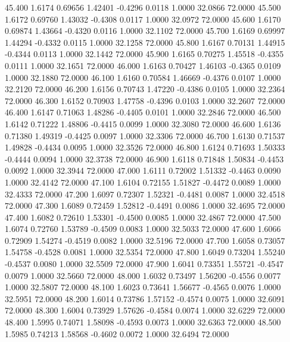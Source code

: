   45.400   1.6174   0.69656   1.42401  -0.4296   0.0118   1.0000  32.0866  72.0000
  45.500   1.6172   0.69760   1.43032  -0.4308   0.0117   1.0000  32.0972  72.0000
  45.600   1.6170   0.69874   1.43664  -0.4320   0.0116   1.0000  32.1102  72.0000
  45.700   1.6169   0.69997   1.44294  -0.4332   0.0115   1.0000  32.1258  72.0000
  45.800   1.6167   0.70131   1.44915  -0.4344   0.0113   1.0000  32.1442  72.0000
  45.900   1.6165   0.70275   1.45518  -0.4355   0.0111   1.0000  32.1651  72.0000
  46.000   1.6163   0.70427   1.46103  -0.4365   0.0109   1.0000  32.1880  72.0000
  46.100   1.6160   0.70584   1.46669  -0.4376   0.0107   1.0000  32.2120  72.0000
  46.200   1.6156   0.70743   1.47220  -0.4386   0.0105   1.0000  32.2364  72.0000
  46.300   1.6152   0.70903   1.47758  -0.4396   0.0103   1.0000  32.2607  72.0000
  46.400   1.6147   0.71063   1.48286  -0.4405   0.0101   1.0000  32.2846  72.0000
  46.500   1.6142   0.71222   1.48806  -0.4415   0.0099   1.0000  32.3080  72.0000
  46.600   1.6136   0.71380   1.49319  -0.4425   0.0097   1.0000  32.3306  72.0000
  46.700   1.6130   0.71537   1.49828  -0.4434   0.0095   1.0000  32.3526  72.0000
  46.800   1.6124   0.71693   1.50333  -0.4444   0.0094   1.0000  32.3738  72.0000
  46.900   1.6118   0.71848   1.50834  -0.4453   0.0092   1.0000  32.3944  72.0000
  47.000   1.6111   0.72002   1.51332  -0.4463   0.0090   1.0000  32.4142  72.0000
  47.100   1.6104   0.72155   1.51827  -0.4472   0.0089   1.0000  32.4333  72.0000
  47.200   1.6097   0.72307   1.52321  -0.4481   0.0087   1.0000  32.4518  72.0000
  47.300   1.6089   0.72459   1.52812  -0.4491   0.0086   1.0000  32.4695  72.0000
  47.400   1.6082   0.72610   1.53301  -0.4500   0.0085   1.0000  32.4867  72.0000
  47.500   1.6074   0.72760   1.53789  -0.4509   0.0083   1.0000  32.5033  72.0000
  47.600   1.6066   0.72909   1.54274  -0.4519   0.0082   1.0000  32.5196  72.0000
  47.700   1.6058   0.73057   1.54758  -0.4528   0.0081   1.0000  32.5354  72.0000
  47.800   1.6049   0.73204   1.55240  -0.4537   0.0080   1.0000  32.5509  72.0000
  47.900   1.6041   0.73351   1.55721  -0.4547   0.0079   1.0000  32.5660  72.0000
  48.000   1.6032   0.73497   1.56200  -0.4556   0.0077   1.0000  32.5807  72.0000
  48.100   1.6023   0.73641   1.56677  -0.4565   0.0076   1.0000  32.5951  72.0000
  48.200   1.6014   0.73786   1.57152  -0.4574   0.0075   1.0000  32.6091  72.0000
  48.300   1.6004   0.73929   1.57626  -0.4584   0.0074   1.0000  32.6229  72.0000
  48.400   1.5995   0.74071   1.58098  -0.4593   0.0073   1.0000  32.6363  72.0000
  48.500   1.5985   0.74213   1.58568  -0.4602   0.0072   1.0000  32.6494  72.0000

